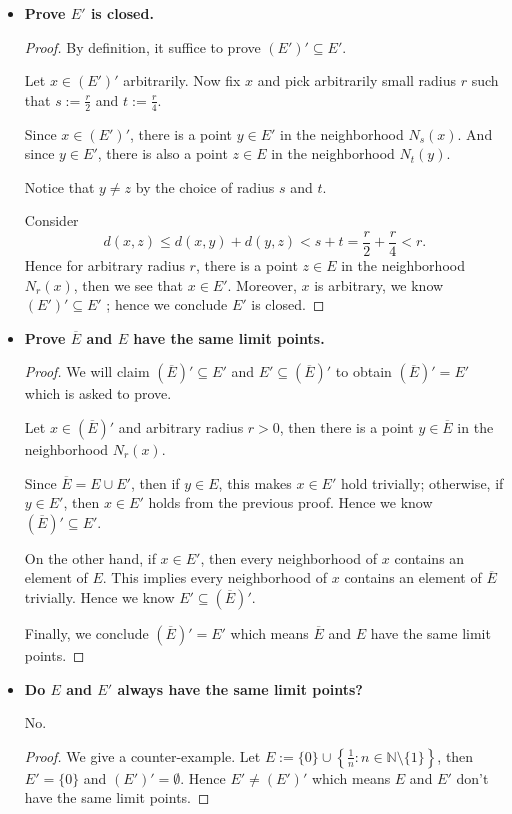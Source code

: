 \begin{Exercise}
	\begin{itemize}
		\item \textbf{Prove $E'$ is closed.}
		\begin{proof}
			By definition, it suffice to prove $(E')' \subseteq E'$. 
			
			Let $x\in (E')'$ arbitrarily. Now fix $x$ and pick arbitrarily small radius $r$ such that $s := \frac{r}{2}$ and $t := \frac{r}{4}$.
			
			Since $x\in (E')'$, there is a point $y\in E'$ in the neighborhood $N_s(x)$. And since $y\in E'$, there is also a point $z\in E$ in the neighborhood $N_t(y)$. 
			
			Notice that $y\neq z$ by the choice of radius $s$ and $t$.
			
			Consider
			$$
			d(x,z)
			\leq d(x,y) + d(y,z)
			< s + t
			= \frac{r}{2} + \frac{r}{4}
			< r.
			$$
			Hence for arbitrary radius $r$, there is a point $z\in E$ in the neighborhood $N_r(x)$, then we see that $x\in E'$. Moreover, $x$ is arbitrary, we know $(E')' \subseteq E'$ ; hence we conclude $E'$ is closed.
		\end{proof}
		
		\item \textbf{Prove $\overline{E}$ and $E$ have the same limit points.}
		
		\begin{proof}
			We will claim $(\overline{E})' \subseteq E'$ and $E' \subseteq (\overline{E})'$ to obtain $(\overline{E})' = E'$ which is asked to prove.
			
			Let $x\in (\overline{E})'$ and arbitrary radius $r > 0$, then there is a point $y\in \overline{E}$ in the neighborhood $N_r(x)$.
			
			Since $\overline{E} = E\cup E'$, then if $y\in E$, this makes $x\in E'$ hold trivially; otherwise, if $y\in E'$, then $x\in E'$ holds from the previous proof. Hence we know $(\overline{E})' \subseteq E'$.
			
			On the other hand, if $x\in E'$, then every neighborhood of $x$ contains an element of $E$. This implies every neighborhood of $x$ contains an element of $\overline{E}$ trivially. Hence we know $E' \subseteq (\overline{E})'$.
			
			Finally, we conclude $(\overline{E})' = E'$ which means $\overline{E}$ and $E$ have the same limit points.
		\end{proof}
		
		\item \textbf{Do $E$ and $E'$ always have the same limit points?}
		\begin{answer}
			No.
		\end{answer}
		\begin{proof}
			We give a counter-example.
			Let $E := \{0\} \cup \left\{ \frac{1}{n}:n\in\mathbb{N}\setminus\{1\} \right\}$, then $E' = \{0\}$ and $(E')' = \emptyset$. Hence $E' \neq (E')'$ which means $E$ and $E'$ don't have the same limit points.
		\end{proof}
	\end{itemize}
\end{Exercise}